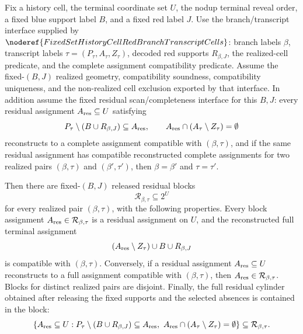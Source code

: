 \begin{helper}
Fix a history cell, the terminal coordinate set \(U\), the nodup terminal
reveal order, a fixed blue support label \(B\), and a fixed red label \(J\).
Use the branch/transcript interface supplied by
\(\noderef{FixedSetHistoryCellRedBranchTranscriptCells}\): branch labels
\(\beta\), transcript labels \(\tau=(P_\tau,A_\tau,Z_\tau)\), decoded red
supports \(R_{\beta,J}\), the realized-cell predicate, and the complete
assignment compatibility predicate.  Assume the fixed-\((B,J)\) realized
geometry, compatibility soundness, compatibility uniqueness, and the
non-realized cell exclusion exported by that interface.  In addition assume
the fixed residual scan/completeness interface for this \(B,J\): every
residual assignment \(A_{\rm res}\subseteq U\) satisfying
\[
P_\tau\setminus(B\cup R_{\beta,J})\subseteq A_{\rm res},\qquad
A_{\rm res}\cap(A_\tau\setminus Z_\tau)=\emptyset
\]
reconstructs to a complete assignment compatible with \((\beta,\tau)\), and
if the same residual assignment has compatible reconstructed complete
assignments for two realized pairs \((\beta,\tau)\) and
\((\beta',\tau')\), then \(\beta=\beta'\) and \(\tau=\tau'\).

Then there are fixed-\((B,J)\) released residual blocks
\[
\mathcal R_{\beta,\tau}\subseteq 2^U
\]
for every realized pair \((\beta,\tau)\), with the following properties.
Every block assignment \(A_{\rm res}\in\mathcal R_{\beta,\tau}\) is a
residual assignment on \(U\), and the reconstructed full terminal assignment
\[
(A_{\rm res}\setminus Z_\tau)\cup B\cup R_{\beta,J}
\]
is compatible with \((\beta,\tau)\).  Conversely, if a residual assignment
\(A_{\rm res}\subseteq U\) reconstructs to a full assignment compatible with
\((\beta,\tau)\), then \(A_{\rm res}\in\mathcal R_{\beta,\tau}\).  Blocks
for distinct realized pairs are disjoint.  Finally, the full residual
cylinder obtained after releasing the fixed supports and the selected
absences is contained in the block:
\[
\{A_{\rm res}\subseteq U:
P_\tau\setminus(B\cup R_{\beta,J})\subseteq A_{\rm res},\
A_{\rm res}\cap(A_\tau\setminus Z_\tau)=\emptyset\}
\subseteq \mathcal R_{\beta,\tau}.
\]
\end{helper}
